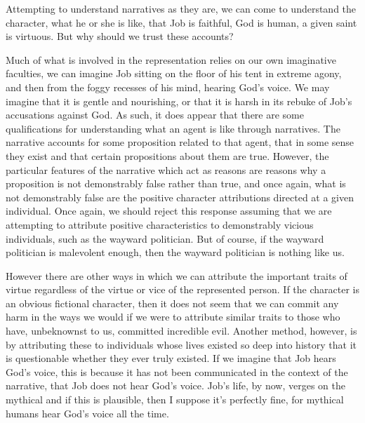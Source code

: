 \documentclass[
  letterpaper,
  DIV=11,
  numbers=noendperiod]{scrartcl}
\theoremstyle{remark}
\begin{document}
Attempting to understand narratives as they are, we can come to
understand the character, what he or she is like, that Job is faithful,
God is human, a given saint is virtuous. But why should we trust these
accounts?

Much of what is involved in the representation relies on our own
imaginative faculties, we can imagine Job sitting on the floor of his
tent in extreme agony, and then from the foggy recesses of his mind,
hearing God's voice. We may imagine that it is gentle and nourishing, or
that it is harsh in its rebuke of Job's accusations against God. As
such, it does appear that there are some qualifications for
understanding what an agent is like through narratives. The narrative
accounts for some proposition related to that agent, that in some sense
they exist and that certain propositions about them are true. However,
the particular features of the narrative which act as reasons are
reasons why a proposition is not demonstrably false rather than true,
and once again, what is not demonstrably false are the positive
character attributions directed at a given individual. Once again, we
should reject this response assuming that we are attempting to attribute
positive characteristics to demonstrably vicious individuals, such as
the wayward politician. But of course, if the wayward politician is
malevolent enough, then the wayward politician is nothing like us.

However there are other ways in which we can attribute the important
traits of virtue regardless of the virtue or vice of the represented
person. If the character is an obvious fictional character, then it does
not seem that we can commit any harm in the ways we would if we were to
attribute similar traits to those who have, unbeknownst to us, committed
incredible evil. Another method, however, is by attributing these to
individuals whose lives existed so deep into history that it is
questionable whether they ever truly existed. If we imagine that Job
hears God's voice, this is because it has not been communicated in the
context of the narrative, that Job does not hear God's voice. Job's
life, by now, verges on the mythical and if this is plausible, then I
suppose it's perfectly fine, for mythical humans hear God's voice all
the time.
\end{document}
